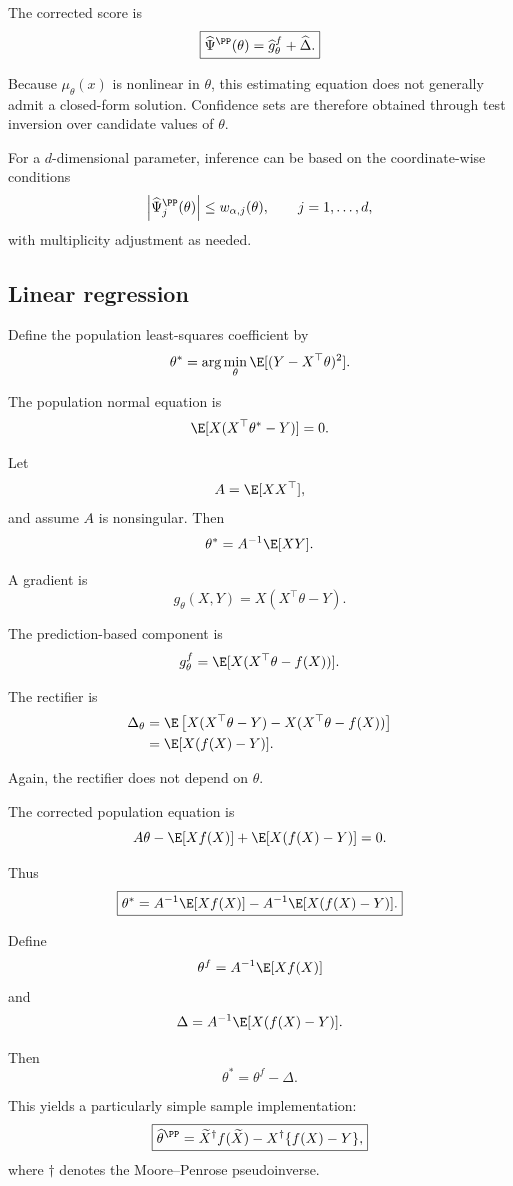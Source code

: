 The corrected score is
\[
\boxed{
\widehat\Psi^{\PP}(\theta)
=
\widehat g_\theta^f
+
\widehat\Delta.
}
\]

Because $\mu_\theta(x)$ is nonlinear in $\theta$, this estimating
equation does not generally admit a closed-form solution. Confidence
sets are therefore obtained through test inversion over candidate
values of $\theta$.

For a $d$-dimensional parameter, inference can be based on the
coordinate-wise conditions
\[
\left|
\widehat\Psi_j^{\PP}(\theta)
\right|
\leq
w_{\alpha,j}(\theta),
\qquad j=1,\ldots,d,
\]
with multiplicity adjustment as needed.

\subsection{Linear regression}

Define the population least-squares coefficient by
\[
\theta^*
=
\arg\min_\theta
\E[(Y-X^\top\theta)^2].
\]

The population normal equation is
\[
\E[
X(X^\top\theta^*-Y)
]
=
0.
\]

Let
\[
A=\E[XX^\top],
\]
and assume $A$ is nonsingular. Then
\[
\theta^*
=
A^{-1}\E[XY].
\]

A gradient is
\[
g_\theta(X,Y)
=
X(X^\top\theta-Y).
\]

The prediction-based component is
\[
g_\theta^f
=
\E[
X(X^\top\theta-f(X))
].
\]

The rectifier is
\[
\begin{aligned}
\Delta_\theta
&=
\E\left[
X(X^\top\theta-Y)
-
X(X^\top\theta-f(X))
\right]
\\
&=
\E[X(f(X)-Y)].
\end{aligned}
\]

Again, the rectifier does not depend on $\theta$.

The corrected population equation is
\[
A\theta
-
\E[Xf(X)]
+
\E[X(f(X)-Y)]
=
0.
\]

Thus
\[
\boxed{
\theta^*
=
A^{-1}\E[Xf(X)]
-
A^{-1}\E[X(f(X)-Y)].
}
\]

Define
\[
\theta^f
=
A^{-1}\E[Xf(X)]
\]
and
\[
\Delta
=
A^{-1}\E[X(f(X)-Y)].
\]

Then
\[
\boxed{
\theta^*
=
\theta^f-\Delta.
}
\]

This yields a particularly simple sample implementation:
\[
\boxed{
\widehat\theta^{\PP}
=
\widetilde X^\dagger f(\widetilde X)
-
X^\dagger\{f(X)-Y\},
}
\]
where $\dagger$ denotes the Moore--Penrose pseudoinverse.

